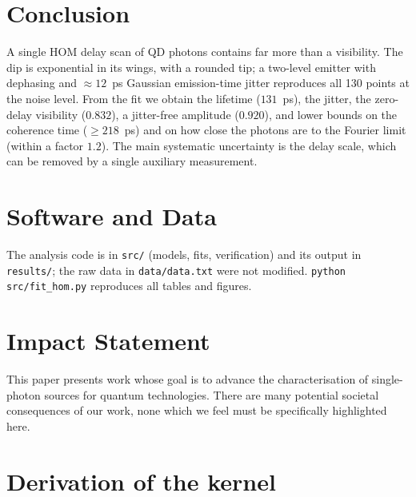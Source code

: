 \documentclass{article}
\begin{document}
\section{Conclusion}

A single HOM delay scan of QD photons contains far more than a visibility.
The dip is exponential in its wings, with a rounded tip; a two-level
emitter with dephasing and $\approx12$~ps Gaussian emission-time jitter
reproduces all 130 points at the noise level. From the fit we obtain the
lifetime ($131$~ps), the jitter, the zero-delay visibility ($0.832$), a
jitter-free amplitude ($0.920$), and lower bounds on the coherence time
($\ge218$~ps) and on how close the photons are to the Fourier limit
(within a factor $1.2$). The main systematic uncertainty is the delay scale,
which can be removed by a single auxiliary measurement.

\section*{Software and Data}
The analysis code is in \texttt{src/} (models, fits, verification) and its
output in \texttt{results/}; the raw data in \texttt{data/data.txt} were
not modified. \texttt{python src/fit\_hom.py} reproduces all tables and
figures.

\section*{Impact Statement}
This paper presents work whose goal is to advance the characterisation of
single-photon sources for quantum technologies. There are many potential
societal consequences of our work, none which we feel must be specifically
highlighted here.




\newpage
\appendix
\onecolumn

\section{Derivation of the kernel}
\label{app:deriv}
\end{document}

